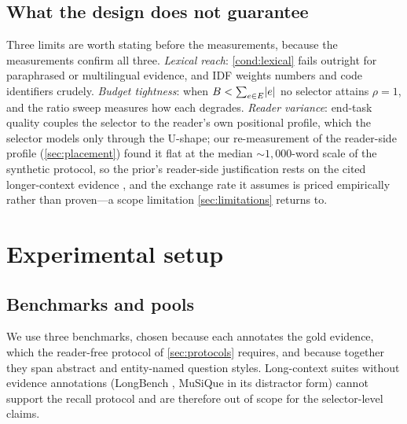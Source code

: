 \documentclass[pdflatex,sn-basic]{sn-jnl}
\DeclarePairedDelimiter\abs{\lvert}{\rvert}
\theoremstyle{remark}
\begin{document}
\subsection{What the design does not guarantee}
Three limits are worth stating before the measurements, because the
measurements confirm all three. \emph{Lexical reach}:
\autoref{cond:lexical} fails outright for paraphrased or multilingual
evidence, and IDF weights numbers and code identifiers crudely.
\emph{Budget tightness}: when
$B < \sum_{e \in E} \abs{e}$ no selector attains $\rho = 1$, and the
ratio sweep measures how each degrades. \emph{Reader variance}:
end-task quality couples the selector to the reader's own positional
profile, which the selector models only through the U-shape; our
re-measurement of the reader-side profile (\autoref{sec:placement})
found it flat at the median ${\sim}1{,}000$-word scale of the synthetic
protocol, so the prior's reader-side justification rests on the cited
longer-context evidence \citep{liu2023lost}, and the exchange rate it
assumes is priced empirically rather than proven---a scope limitation
\autoref{sec:limitations} returns to.

\section{Experimental setup}
\label{sec:exp}

\subsection{Benchmarks and pools}
\label{sec:pools}
We use three benchmarks, chosen because each annotates the gold
evidence, which the reader-free protocol of \autoref{sec:protocols}
requires, and because together they span abstract and entity-named
question styles. Long-context suites without evidence annotations
(LongBench \citep{bai2023longbench}, MuSiQue \citep{trivedi2022musique}
in its distractor form) cannot support the recall protocol and are
therefore out of scope for the selector-level claims.
\end{document}
